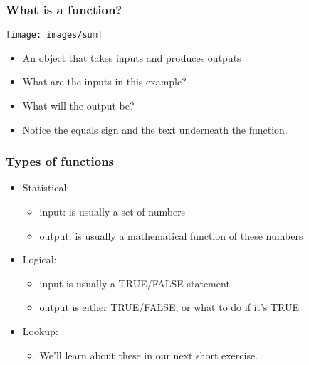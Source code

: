 \documentclass[11pt]{beamer}
\begin{document}
\begin{frame}
 \frametitle{What is a function?}
 \begin{center}
 \texttt{[image: images/sum]}
 \end{center}
 \begin{itemize}
 \item An object that takes inputs and produces outputs \pause
 \item What are the inputs in this example? \pause
 \item What will the output be? \pause
 \item Notice the equals sign and the text underneath the function.
 \end{itemize}
\end{frame}

\begin{frame}
 \frametitle{Types of functions}
\begin{itemize}
\item \alert{Statistical}: 
\begin{itemize}
\item \alert{input}: is usually a set of numbers
\item \alert{output}: is usually a mathematical function of these numbers
\end{itemize} \pause \bigskip
\item \alert{Logical:} 
\begin{itemize}
\item \alert{input} is usually a TRUE/FALSE statement
\item \alert{output} is either TRUE/FALSE, or what to do if it's TRUE
\end{itemize} \pause \bigskip 
\item \alert{Lookup}: 
\begin{itemize}
	\item We'll learn about these in our next short exercise. 
\end{itemize} 
\end{itemize} 
\end{frame}
\end{document}
